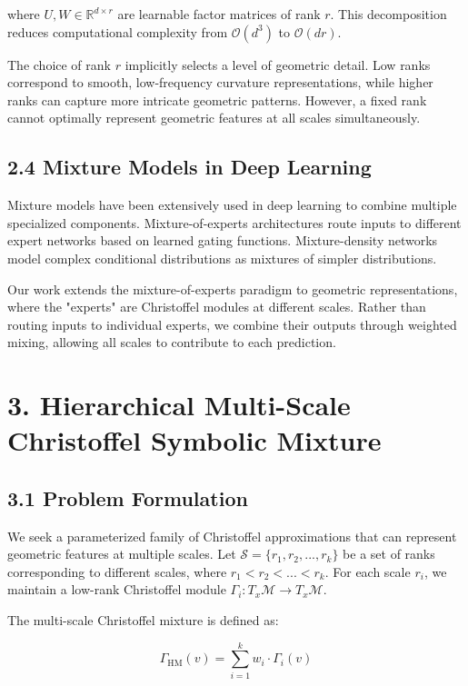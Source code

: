 \documentclass[12pt]{article}
\begin{document}
where $U, W \in \mathbb{R}^{d \times r}$ are learnable factor matrices of rank $r$. This decomposition reduces computational complexity from $\mathcal{O}(d^3)$ to $\mathcal{O}(dr)$.

The choice of rank $r$ implicitly selects a level of geometric detail. Low ranks correspond to smooth, low-frequency curvature representations, while higher ranks can capture more intricate geometric patterns. However, a fixed rank cannot optimally represent geometric features at all scales simultaneously.

\subsection{2.4 Mixture Models in Deep Learning}

Mixture models have been extensively used in deep learning to combine multiple specialized components. Mixture-of-experts architectures route inputs to different expert networks based on learned gating functions. Mixture-density networks model complex conditional distributions as mixtures of simpler distributions.

Our work extends the mixture-of-experts paradigm to geometric representations, where the "experts" are Christoffel modules at different scales. Rather than routing inputs to individual experts, we combine their outputs through weighted mixing, allowing all scales to contribute to each prediction.

\section{3. Hierarchical Multi-Scale Christoffel Symbolic Mixture}

\subsection{3.1 Problem Formulation}

We seek a parameterized family of Christoffel approximations that can represent geometric features at multiple scales. Let $\mathcal{S} = \{r_1, r_2, ..., r_k\}$ be a set of ranks corresponding to different scales, where $r_1 < r_2 < ... < r_k$. For each scale $r_i$, we maintain a low-rank Christoffel module $\Gamma_i: T_x\mathcal{M} \to T_x\mathcal{M}$.

The multi-scale Christoffel mixture is defined as:

\begin{equation}
\Gamma_{\text{HM}}(v) = \sum_{i=1}^k w_i \cdot \Gamma_i(v)
\end{equation}
\end{document}
